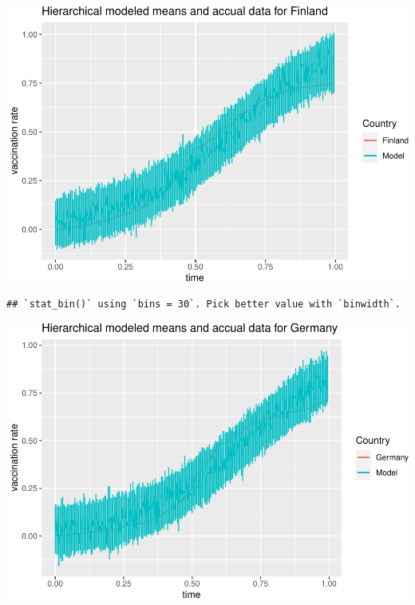\documentclass[
]{article}
\newenvironment{Shaded}{\begin{snugshade}}{\end{snugshade}}
\newcommand{\AttributeTok}[1]{\textcolor[rgb]{0.77,0.63,0.00}{#1}}
\newcommand{\DecValTok}[1]{\textcolor[rgb]{0.00,0.00,0.81}{#1}}
\newcommand{\FunctionTok}[1]{\textcolor[rgb]{0.00,0.00,0.00}{#1}}
\newcommand{\NormalTok}[1]{#1}
\newcommand{\SpecialCharTok}[1]{\textcolor[rgb]{0.00,0.00,0.00}{#1}}
\newcommand{\StringTok}[1]{\textcolor[rgb]{0.31,0.60,0.02}{#1}}
\begin{document}
\includegraphics{bda_project_files/figure-latex/unnamed-chunk-30-1.pdf}

\begin{Shaded}
\end{Shaded}

\begin{verbatim}
## `stat_bin()` using `bins = 30`. Pick better value with `binwidth`.
\end{verbatim}

\includegraphics{bda_project_files/figure-latex/unnamed-chunk-31-1.pdf}
\end{document}
